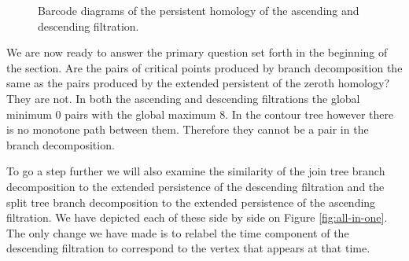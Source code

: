 \begin{figure}[h]%
    \centering
    \qquad \qquad

    \caption{Barcode diagrams of the persistent homology of the ascending and descending filtration.}%
    \label{fig:barcode-asc-desc}%
\end{figure}

We are now ready to answer the primary question set forth in the beginning of the section. Are the pairs of critical points produced by branch decomposition the same as the pairs produced by the extended persistent of the zeroth homology? They are not. In both the ascending and descending filtrations the global minimum $0$ pairs with the global maximum $8$. In the contour tree however there is no monotone path between them. Therefore they cannot be a pair in the branch decomposition.

To go a step further we will also examine the similarity of the join tree branch decomposition to the extended persistence of the descending filtration and the split tree branch decomposition to the extended persistence of the ascending filtration. We have depicted each of these side by side on Figure \ref{fig:all-in-one}. The only change we have made is to relabel the time component of the descending filtration to correspond to the vertex that appears at that time.

